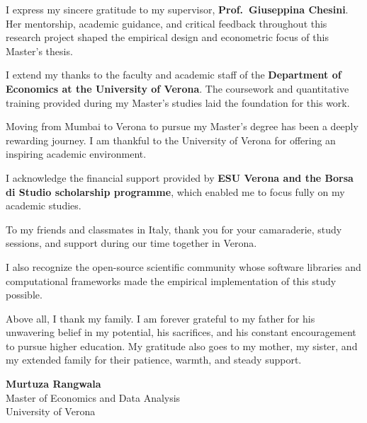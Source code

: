 \documentclass[12pt, a4paper]{report}
\begin{document}
\begin{singlespace}
\setlength{\parskip}{4pt}

\noindent I express my sincere gratitude to my supervisor, \textbf{Prof.\ Giuseppina Chesini}. Her mentorship, academic guidance, and critical feedback throughout this research project shaped the empirical design and econometric focus of this Master's thesis.

\noindent I extend my thanks to the faculty and academic staff of the \textbf{Department of Economics at the University of Verona}. The coursework and quantitative training provided during my Master's studies laid the foundation for this work.

\noindent Moving from Mumbai to Verona to pursue my Master's degree has been a deeply rewarding journey. I am thankful to the University of Verona for offering an inspiring academic environment.

\noindent I acknowledge the financial support provided by \textbf{ESU Verona and the Borsa di Studio scholarship programme}, which enabled me to focus fully on my academic studies.

\noindent To my friends and classmates in Italy, thank you for your camaraderie, study sessions, and support during our time together in Verona.

\noindent I also recognize the open-source scientific community whose software libraries and computational frameworks made the empirical implementation of this study possible.

\noindent Above all, I thank my family. I am forever grateful to my father for his unwavering belief in my potential, his sacrifices, and his constant encouragement to pursue higher education. My gratitude also goes to my mother, my sister, and my extended family for their patience, warmth, and steady support.

\vspace{0.6cm}

\begin{flushright}
\textbf{Murtuza Rangwala}\\
Master of Economics and Data Analysis\\
University of Verona
\end{flushright}

\end{singlespace}

\newpage

\tableofcontents
\listoffigures
\listoftables

\newpage
{}







\newpage
{}

\end{document}
